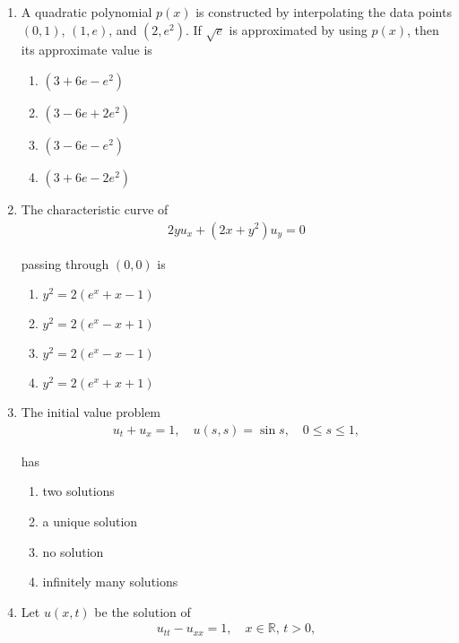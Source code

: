 \documentclass[journal]{IEEEtran}
\numberwithin{equation}{enumi}
\numberwithin{figure}{enumi}
\begin{document}
\begin{enumerate}
\item
A quadratic polynomial $p(x)$ is constructed by interpolating the data points $(0,1)$, $(1,e)$, and $(2,e^2)$. If $\sqrt{e}$ is approximated by using $p(x)$, then its approximate value is
\hfill{}
\begin{multicols}{2}
\begin{enumerate}
    \item $(3 + 6 e - e^2)$
    \item $(3 - 6 e + 2 e^2)$
    \item $(3 - 6 e - e^2)$
    \item $(3 + 6 e - 2 e^2)$
\end{enumerate}
\end{multicols}

\item
The characteristic curve of
\begin{align}
    2 y u_x + (2x + y^2) u_y = 0
\end{align}

passing through $(0,0)$ is
\hfill{}
\begin{multicols}{2}
\begin{enumerate}
    \item $y^2 = 2(e^x + x - 1)$
    \item $y^2 = 2(e^x - x + 1)$
    \item $y^2 = 2(e^x - x - 1)$
    \item $y^2 = 2(e^x + x + 1)$
\end{enumerate}
\end{multicols}

\item
The initial value problem
\begin{align}
    u_t + u_x = 1, \quad u(s,s) = \sin s, \quad 0 \leq s \leq 1,
\end{align}

has
\hfill{}
\begin{multicols}{2}
\begin{enumerate}
    \item two solutions
    \item a unique solution
    \item no solution
    \item infinitely many solutions
\end{enumerate}
\end{multicols}

\item
Let $u(x,t)$ be the solution of 
\begin{align}
    u_{tt} - u_{xx} = 1, \quad x \in \mathbb{R}, \, t > 0,
\end{align}


\end{enumerate}
\end{document}
